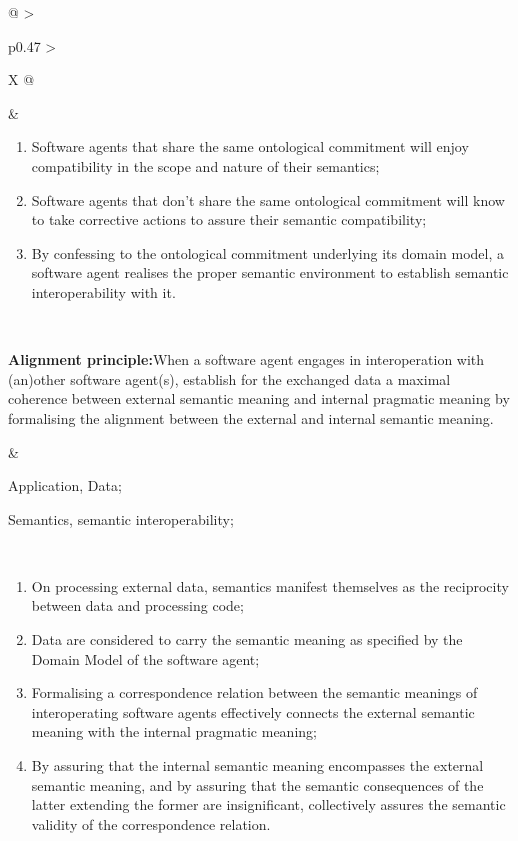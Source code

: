 \begin{xltabular}[l]{\linewidth}{@{} >{\small\raggedright\arraybackslash}p{0.47\linewidth} >{\small\raggedright\arraybackslash}X @{}}
\begin{enumerate}[left=6pt, nosep]
\end{enumerate}
&
\begin{enumerate}[left=10pt, nosep]
  \item Software agents that share the same ontological commitment will enjoy compatibility in the scope and nature of their semantics;
  \item Software agents that don't share the same ontological commitment will know to take corrective actions to assure their semantic compatibility;
  \item By confessing to the ontological commitment underlying its domain model, a software agent realises the proper semantic environment to establish semantic interoperability with it.
\end{enumerate} \\
%
%
%
\begin{mmdp}\label{dp:alignment}{\bfseries Alignment principle:}\quad When a software agent engages in interoperation with (an)other software agent(s), establish for the exchanged data a maximal coherence between external semantic meaning and internal pragmatic meaning by formalising the alignment between the external and internal semantic meaning. \end{mmdp}
&
\begin{description}[labelwidth=3.7cm,leftmargin=3.7cm+1ex,nosep,topsep=2ex,labelsep=1ex,font=\bfseries]
  \item[Type of information:] Application, Data;
  \item[Quality attributes:] Semantics, semantic interoperability;
\end{description}\\
\begin{enumerate}[left=6pt, nosep]
  \item On processing external data, semantics manifest themselves as the reciprocity between data and processing code;
  \item Data are considered to carry the semantic meaning as specified by the Domain Model of the software agent;
  \item Formalising a correspondence relation between the semantic meanings of interoperating software agents effectively connects the external semantic meaning with the internal pragmatic meaning;
  \item By assuring that the internal semantic meaning encompasses the external semantic meaning, and by assuring that the semantic consequences of the latter extending the former are insignificant, collectively assures the semantic validity of the correspondence relation.

\end{enumerate}
\end{xltabular}
